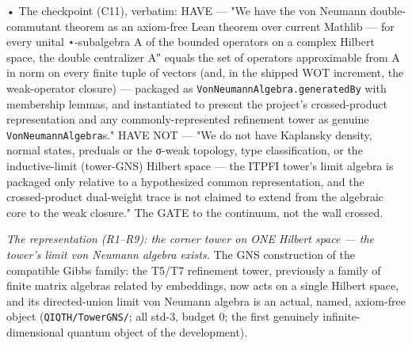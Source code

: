 \documentclass[11pt,a4paper]{article}
\begin{document}
  • The checkpoint (C11), verbatim: HAVE — "We have the von Neumann double-commutant theorem as an axiom-free Lean theorem over current Mathlib — for every unital ⋆-subalgebra A of the bounded operators on a complex Hilbert space, the double centralizer A″ equals the set of operators approximable from A in norm on every finite tuple of vectors (and, in the shipped WOT increment, the weak-operator closure) — packaged as \texttt{VonNeumannAlgebra.generatedBy} with membership lemmas, and instantiated to present the project's crossed-product representation and any commonly-represented refinement tower as genuine \texttt{VonNeumannAlgebra}s." HAVE NOT — "We do not have Kaplansky density, normal states, preduals or the σ-weak topology, type classification, or the inductive-limit (tower-GNS) Hilbert space — the ITPFI tower's limit algebra is packaged only relative to a hypothesized common representation, and the crossed-product dual-weight trace is not claimed to extend from the algebraic core to the weak closure." The GATE to the continuum, not the wall crossed.

\emph{The representation (R1--R9): the corner tower on ONE Hilbert space — the tower's limit von Neumann algebra exists.} The GNS construction of the compatible Gibbs family: the T5/T7 refinement tower, previously a family of finite matrix algebras related by embeddings, now acts on a single Hilbert space, and its directed-union limit von Neumann algebra is an actual, named, axiom-free object (\texttt{QIQTH/TowerGNS/}; all std-3, budget 0; the first genuinely infinite-dimensional quantum object of the development).
\end{document}
